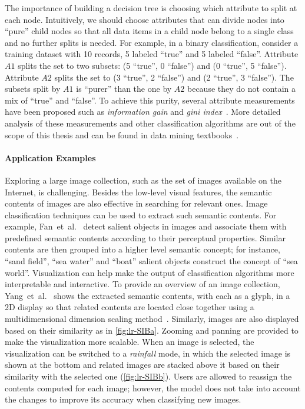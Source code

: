 The importance of building a decision tree is choosing which attribute to split at each node. Intuitively, we should choose attributes that can divide nodes into ``pure'' child nodes so that all data items in a child node belong to a single class and no further splits is needed. For example, in a binary classification, consider a training dataset with 10 records, 5 labeled ``true'' and 5 labeled ``false''. Attribute $A1$ splits the set to two subsets: (5 ``true'', 0 ``false'') and (0 ``true'', 5 ``false''). Attribute $A2$ splits the set to (3 ``true'', 2 ``false'') and (2 ``true'', 3 ``false''). The subsets split by $A1$ is ``purer'' than the one by $A2$ because they do not contain a mix of ``true'' and ``false''. To achieve this purity, several attribute measurements have been proposed such as \emph{information gain} and \emph{gini index}~\cite{Tan2006}. More detailed analysis of these measurements and other classification algorithms are out of the scope of this thesis and can be found in data mining textbooks~\cite{Tan2006,Han2011}.

\paragraph{Application Examples}
Exploring a large image collection, such as the set of images available on the Internet, is challenging. Besides the low-level visual features, the semantic contents of images are also effective in searching for relevant ones. Image classification techniques can be used to extract such semantic contents. For example, Fan~et~al.~\cite{Fan2004} detect salient objects in images and associate them with predefined semantic contents according to their perceptual properties. Similar contents are then grouped into a higher level semantic concept; for instance, ``sand field'', ``sea water'' and ``boat'' salient objects construct the concept of ``sea world''. Visualization can help make the output of classification algorithms more interpretable and interactive. To provide an overview of an image collection, Yang~et~al.~\cite{Yang2006} shows the extracted semantic contents, with each as a glyph, in a 2D display so that related contents are located close together using a multidimensional dimension scaling method~\cite{Borg2005}. Similarly, images are also displayed based on their similarity as in \autoref{fig:lr-SIBa}. Zooming and panning are provided to make the visualization more scalable. When an image is selected, the visualization can be switched to a \emph{rainfall} mode, in which the selected image is shown at the bottom and related images are stacked above it based on their similarity with the selected one (\autoref{fig:lr-SIBb}). Users are allowed to reassign the contents computed for each image; however, the model does not take into account the changes to improve its accuracy when classifying new images.

